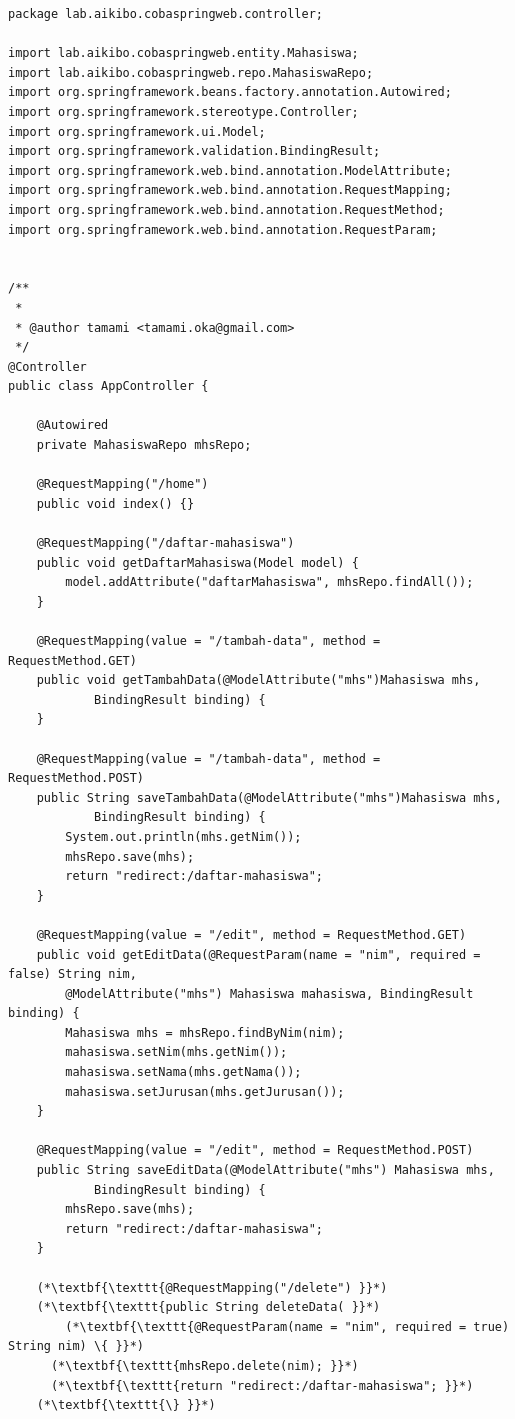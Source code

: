 \begin{enumerate}
	\begin{lstlisting}
package lab.aikibo.cobaspringweb.controller;

import lab.aikibo.cobaspringweb.entity.Mahasiswa;
import lab.aikibo.cobaspringweb.repo.MahasiswaRepo;
import org.springframework.beans.factory.annotation.Autowired;
import org.springframework.stereotype.Controller;
import org.springframework.ui.Model;
import org.springframework.validation.BindingResult;
import org.springframework.web.bind.annotation.ModelAttribute;
import org.springframework.web.bind.annotation.RequestMapping;
import org.springframework.web.bind.annotation.RequestMethod;
import org.springframework.web.bind.annotation.RequestParam;


/**
 *
 * @author tamami <tamami.oka@gmail.com>
 */
@Controller
public class AppController {
    
    @Autowired
    private MahasiswaRepo mhsRepo;
    
    @RequestMapping("/home")
    public void index() {}
    
    @RequestMapping("/daftar-mahasiswa") 
    public void getDaftarMahasiswa(Model model) {
        model.addAttribute("daftarMahasiswa", mhsRepo.findAll());
    }
    
    @RequestMapping(value = "/tambah-data", method = RequestMethod.GET)
    public void getTambahData(@ModelAttribute("mhs")Mahasiswa mhs, 
            BindingResult binding) {
    }
    
    @RequestMapping(value = "/tambah-data", method = RequestMethod.POST) 
    public String saveTambahData(@ModelAttribute("mhs")Mahasiswa mhs,
            BindingResult binding) {
        System.out.println(mhs.getNim());
        mhsRepo.save(mhs);
        return "redirect:/daftar-mahasiswa";
    }

    @RequestMapping(value = "/edit", method = RequestMethod.GET)
    public void getEditData(@RequestParam(name = "nim", required = false) String nim, 
    	@ModelAttribute("mhs") Mahasiswa mahasiswa, BindingResult binding) {
    	Mahasiswa mhs = mhsRepo.findByNim(nim);
    	mahasiswa.setNim(mhs.getNim());
    	mahasiswa.setNama(mhs.getNama());
    	mahasiswa.setJurusan(mhs.getJurusan());
    }

    @RequestMapping(value = "/edit", method = RequestMethod.POST)
    public String saveEditData(@ModelAttribute("mhs") Mahasiswa mhs, 
    		BindingResult binding) {
    	mhsRepo.save(mhs);
    	return "redirect:/daftar-mahasiswa";
    }

    (*\textbf{\texttt{@RequestMapping("/delete") }}*)
    (*\textbf{\texttt{public String deleteData( }}*)
        (*\textbf{\texttt{@RequestParam(name = "nim", required = true) String nim) \{ }}*)
      (*\textbf{\texttt{mhsRepo.delete(nim); }}*)
      (*\textbf{\texttt{return "redirect:/daftar-mahasiswa"; }}*)
    (*\textbf{\texttt{\} }}*)
    

\end{lstlisting}
\end{enumerate}
